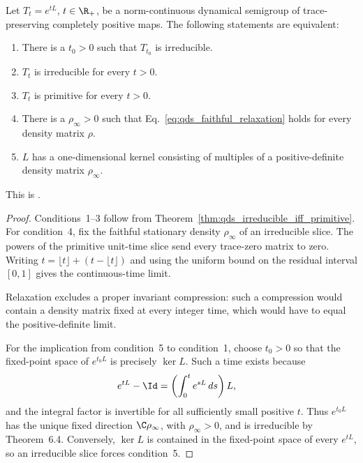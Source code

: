 \begin{theorem}
    \label{thm:wolf_prop_7_5_full_equivalence}
    \leanok
    Let $T_t=e^{tL}$, $t\in\R_+$, be a norm-continuous dynamical semigroup
    of trace-preserving completely positive maps.  The following statements
    are equivalent:
    \begin{enumerate}
        \item There is a $t_0>0$ such that $T_{t_0}$ is irreducible.
        \item $T_t$ is irreducible for every $t>0$.
        \item $T_t$ is primitive for every $t>0$.
        \item There is a $\rho_\infty>0$ such that
              Eq.~\eqref{eq:qds_faithful_relaxation} holds for every density
              matrix $\rho$.
        \item $L$ has a one-dimensional kernel consisting of multiples of a
              positive-definite density matrix $\rho_\infty$.
    \end{enumerate}
    This is \cite[Proposition~7.5]{Wolf2012Quantum}.
\end{theorem}

\begin{proof}\leanok
    Conditions~1--3 follow from
    Theorem~\ref{thm:qds_irreducible_iff_primitive}.  For condition~4, fix the
    faithful stationary density $\rho_\infty$ of an irreducible slice.  The
    powers of the primitive unit-time slice send every trace-zero matrix to
    zero.  Writing $t=\lfloor t\rfloor+(t-\lfloor t\rfloor)$ and using the
    uniform bound on the residual interval $[0,1]$ gives the continuous-time
    limit.

    Relaxation excludes a proper invariant compression: such a compression
    would contain a density matrix fixed at every integer time, which would
    have to equal the positive-definite limit.

    For the implication from condition~5 to condition~1, choose $t_0>0$ so
    that the fixed-point space of $e^{t_0L}$ is precisely $\ker L$.  Such a
    time exists because
    \begin{align}
        e^{tL}-\Id
        &=\left(\int_0^t e^{sL}\,ds\right)L,
    \end{align}
    and the integral factor is invertible for all sufficiently small positive
    $t$.  Thus $e^{t_0L}$ has the unique fixed direction
    $\C\rho_\infty$, with $\rho_\infty>0$, and is irreducible by
    Theorem~6.4.  Conversely, $\ker L$ is contained in the fixed-point space
    of every $e^{tL}$, so an irreducible slice forces condition~5.
\end{proof}

